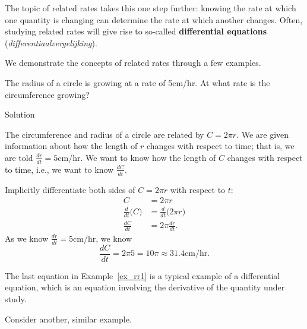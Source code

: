 The topic of related rates takes this one step further: knowing the rate at which one quantity is changing can determine the rate at which another changes. Often, studying related rates will give rise to so-called \textbf{differential equations} (\textit{differentiaalvergelijking}). 

We demonstrate the concepts of related rates through a few examples.

\begin{example}\label{ex_rr1}
The radius of a circle is growing at a rate of 5cm/hr. At what rate is the circumference growing?

Solution 

The circumference and radius of a circle are related by $C = 2\pi r$. We are given information about how the length of $r$ changes with respect to time; that is, we are told $\frac{dr}{dt} = 5$cm/hr. We want to know how the length of $C$ changes with respect to time, i.e., we want to know $\frac{dC}{dt}$. 

Implicitly differentiate both sides of $C = 2\pi r$ with respect to $t$:
\begin{align*}
C 	&= 2\pi r\\
\frac{d}{dt}\big(C\big) &= \frac{d}{dt}\big(2\pi r\big) \\[0.2cm]
\frac{dC}{dt} 	&=	2\pi \frac{dr}{dt}.
\end{align*}
As we know $\frac{dr}{dt} = 5$cm/hr, we know $$\frac{dC}{dt} = 2\pi 5 = 10\pi \approx 31.4\text{cm/hr.}$$ 
\end{example}

The last equation in Example~\ref{ex_rr1} is a typical example of a differential equation, which is an equation involving the derivative of the quantity under study. 


Consider another, similar example.

